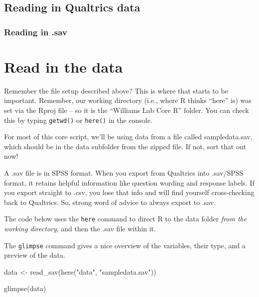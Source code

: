 \documentclass[
  letterpaper,
  DIV=11,
  numbers=noendperiod]{scrreprt}
\newenvironment{Shaded}{\begin{snugshade}}{\end{snugshade}}
\newcommand{\FunctionTok}[1]{\textcolor[rgb]{0.28,0.35,0.67}{#1}}
\newcommand{\NormalTok}[1]{\textcolor[rgb]{0.00,0.23,0.31}{#1}}
\newcommand{\OtherTok}[1]{\textcolor[rgb]{0.00,0.23,0.31}{#1}}
\newcommand{\StringTok}[1]{\textcolor[rgb]{0.13,0.47,0.30}{#1}}
\begin{document}
\section{Reading in Qualtrics data}\label{reading-in-qualtrics-data}

\subsection{Reading in .sav}\label{reading-in-.sav}


\chapter{Read in the data}\label{read-in-the-data}

Remember the file setup described above? This is where that starts to be
important. Remember, our working directory (i.e., where R thinks
``here'' is) was set via the Rproj file -- so it is the ``Williams Lab
Core R'' folder. You can check this by typing \texttt{getwd()} or
\texttt{here()} in the console.

For most of this core script, we'll be using data from a file called
sampledata.sav, which should be in the data subfolder from the zipped
file. If not, sort that out now!

A .sav file is in SPSS format. When you export from Qualtrics into
.sav/SPSS format, it retains helpful information like question wording
and response labels. If you export straight to .csv, you lose that info
and will find yourself cross-checking back to Qualtrics. So, strong word
of advice to always export to .sav.

The code below uses the \texttt{here} command to direct R to the data
folder \emph{from the working directory}, and then the .sav file within
it.

The \texttt{glimpse} command gives a nice overview of the variables,
their type, and a preview of the data.

\begin{Shaded}
\begin{Highlighting}[]
\NormalTok{data }\OtherTok{\textless{}{-}} \FunctionTok{read\_sav}\NormalTok{(}\FunctionTok{here}\NormalTok{(}\StringTok{"data"}\NormalTok{, }\StringTok{"sampledata.sav"}\NormalTok{)) }

\FunctionTok{glimpse}\NormalTok{(data)}
\end{Highlighting}
\end{Shaded}
\end{document}
